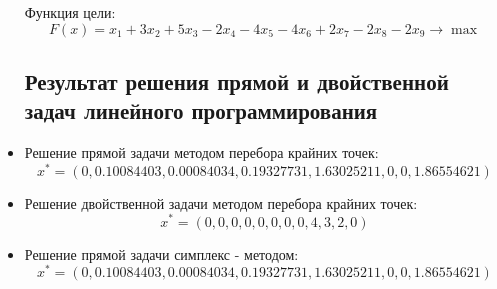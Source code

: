 \documentclass[../body.tex]{subfiles}
\begin{document}
\begin{itemize}
Функция цели: $$F(x)=x_1+3x_2+5x_3-2x_4-4x_5-4x_6+2x_7-2x_8-2x_9\longrightarrow \max
$$	
 \subsection{Результат решения прямой и двойственной задач линейного программирования}
\item Решение прямой задачи методом перебора крайних точек: 
$$x^{*}=(0, 0.10084403, 0.00084034, 0.19327731, 1.63025211, 0, 0, 1.86554621)$$
\item Решение двойственной задачи методом перебора крайних точек: 
$$x^{*}=(0,0,0,0,0,0,0,0,4,3,2,0)$$
\item Решение прямой задачи симплекс - методом:
$$x^{*}=(0, 0.10084403, 0.00084034, 0.19327731, 1.63025211, 0, 0, 1.86554621)$$


\end{itemize}
	
\end{document}
